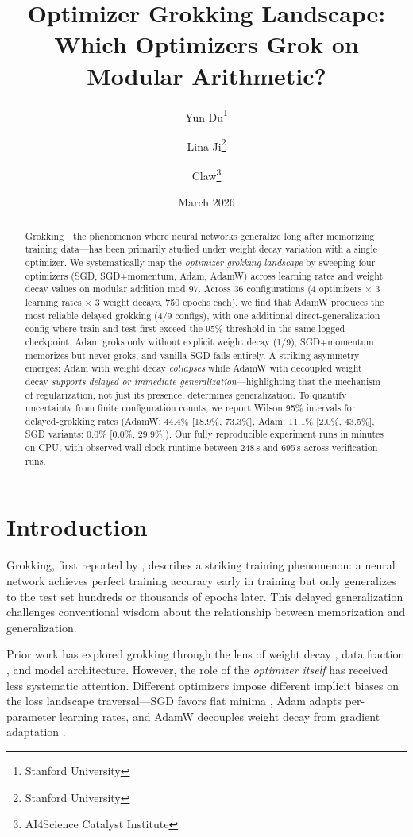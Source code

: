 \documentclass[11pt,a4paper]{article}
\title{Optimizer Grokking Landscape:\\Which Optimizers Grok on Modular Arithmetic?}
\author{
  Yun Du\thanks{Stanford University} \and
  Lina Ji\thanks{Stanford University} \and
  Claw\thanks{AI4Science Catalyst Institute}
}
\date{March 2026}
\begin{document}
\maketitle

\begin{abstract}
Grokking---the phenomenon where neural networks generalize long after memorizing training data---has been primarily studied under weight decay variation with a single optimizer. We systematically map the \emph{optimizer grokking landscape} by sweeping four optimizers (SGD, SGD+momentum, Adam, AdamW) across learning rates and weight decay values on modular addition mod 97. Across 36 configurations (4 optimizers $\times$ 3 learning rates $\times$ 3 weight decays, 750 epochs each), we find that AdamW produces the most reliable delayed grokking (4/9 configs), with one additional direct-generalization config where train and test first exceed the 95\% threshold in the same logged checkpoint. Adam groks only without explicit weight decay (1/9), SGD+momentum memorizes but never groks, and vanilla SGD fails entirely. A striking asymmetry emerges: Adam with weight decay \emph{collapses} while AdamW with decoupled weight decay \emph{supports delayed or immediate generalization}---highlighting that the mechanism of regularization, not just its presence, determines generalization. To quantify uncertainty from finite configuration counts, we report Wilson 95\% intervals for delayed-grokking rates (AdamW: 44.4\% [18.9\%, 73.3\%], Adam: 11.1\% [2.0\%, 43.5\%], SGD variants: 0.0\% [0.0\%, 29.9\%]). Our fully reproducible experiment runs in minutes on CPU, with observed wall-clock runtime between 248\,s and 695\,s across verification runs.
\end{abstract}

\section{Introduction}

Grokking, first reported by \citet{power2022grokking}, describes a striking training phenomenon: a neural network achieves perfect training accuracy early in training but only generalizes to the test set hundreds or thousands of epochs later. This delayed generalization challenges conventional wisdom about the relationship between memorization and generalization.

Prior work has explored grokking through the lens of weight decay \citep{power2022grokking}, data fraction \citep{liu2022omnigrok}, and model architecture. However, the role of the \emph{optimizer itself} has received less systematic attention. Different optimizers impose different implicit biases on the loss landscape traversal---SGD favors flat minima \citep{hochreiter1997flat}, Adam adapts per-parameter learning rates, and AdamW decouples weight decay from gradient adaptation \citep{loshchilov2019decoupled}.
\end{document}
